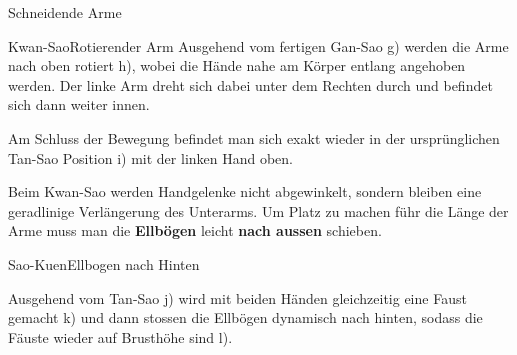 \begin{WTSatz}{Schneidende Arme}
\begin{WTSatzTeil}{Kwan-Sao}{Rotierender Arm}
		Ausgehend vom fertigen Gan-Sao g) werden die Arme nach oben rotiert h), wobei die H\"ande nahe am K\"orper entlang angehoben werden. Der linke Arm dreht sich dabei unter dem Rechten durch und befindet sich dann weiter innen.
		
		Am Schluss der Bewegung befindet man sich exakt wieder in der urspr\"unglichen Tan-Sao Position i) mit der linken Hand oben.
		
		\begin{WTCommonNoob}
			Beim Kwan-Sao werden Handgelenke nicht abgewinkelt, sondern bleiben eine geradlinige Verl\"angerung des Unterarms. Um Platz zu machen f\"uhr die L\"ange der Arme muss man die \textbf{Ellb\"ogen} leicht \textbf{nach aussen} schieben.
		\end{WTCommonNoob}
	\end{WTSatzTeil}
	
	\begin{WTSatzTeil}{Sao-Kuen}{Ellbogen nach Hinten}
		
		Ausgehend vom Tan-Sao j) wird mit beiden H\"anden gleichzeitig eine Faust gemacht k) und dann stossen die Ellb\"ogen dynamisch nach hinten, sodass die F\"auste wieder auf Brusth\"ohe sind l). %
	\end{WTSatzTeil}
	
\end{WTSatz}


